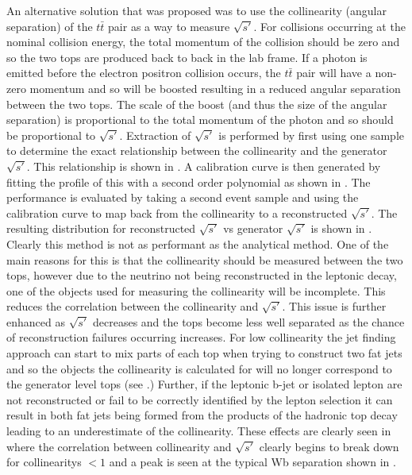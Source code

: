 An alternative solution that was proposed was to use the collinearity (angular separation) of the $t\bar{t}$ pair as a way to measure $\sqrt{s'}$. For collisions occurring at the nominal collision energy, the total momentum of the collision should be zero and so the two tops are produced back to back in the lab frame. If a photon is emitted before the electron positron collision occurs, the $t\bar{t}$ pair will have a non-zero momentum and so will be boosted resulting in a reduced angular separation between the two tops. The scale of the boost (and thus the size of the angular separation) is proportional to the total momentum of the photon and so should be proportional to $\sqrt{s'}$. Extraction of $\sqrt{s'}$ is performed by first using one sample to determine the exact relationship between the collinearity and the generator $\sqrt{s'}$. This relationship is shown in . A calibration curve is then generated by fitting the profile of this with a second order polynomial as shown in . The performance is evaluated by taking a second event sample and using the calibration curve to map back from the collinearity to a reconstructed $\sqrt{s'}$. The resulting distribution for reconstructed $\sqrt{s'}$ vs generator $\sqrt{s'}$ is shown in . Clearly this method is not as performant as the analytical method. One of the main reasons for this is that the collinearity should be measured between the two tops, however due to the neutrino not being reconstructed in the leptonic decay, one of the objects used for measuring the collinearity will be incomplete. This reduces the correlation between the collinearity and $\sqrt{s'}$. This issue is further enhanced as $\sqrt{s'}$ decreases and the tops become less well separated as the chance of reconstruction failures occurring increases. For low collinearity the jet finding approach can start to mix parts of each top when trying to construct two fat jets and so the objects the collinearity is calculated for will no longer correspond to the generator level tops (see .)  Further, if the leptonic b-jet or isolated lepton are not reconstructed or fail to be correctly identified by the lepton selection it can result in both fat jets being formed from the products of the hadronic top decay leading to an underestimate of the collinearity. These effects are clearly seen in  where the correlation between collinearity and $\sqrt{s'}$ clearly begins to break down for collinearitys $<1$ and a peak is seen at the typical Wb separation shown in . 

